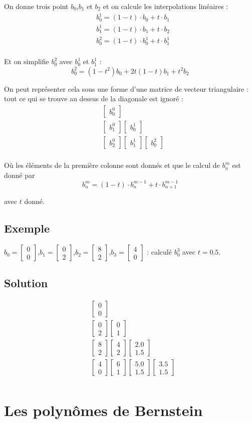 \documentclass[11pt,a4paper]{report}
\newcommand{\matv}[2]{\begin{bmatrix}#1 \\ #2 \end{bmatrix}}
\newcommand{\mato}[1]{\begin{bmatrix}#1\end{bmatrix}}
\begin{document}
On donne trois point $b_0$,$b_1$ et $b_2$ et on calcule les interpolations linéaires :
\begin{align*}
& b_0^1 = (1-t)\cdot b_0 + t \cdot b_1    \\
& b_1^1 = (1-t)\cdot b_1 + t \cdot b_2    \\
& b_0^2 = (1-t)\cdot b_0^1 + t \cdot b_1^1\\
\end{align*}

Et on simplifie $b_0^2$ avec $b_0^1$ et $b_1^1$ :
$$
b_0^2 = (1-t^2)b_0 + 2t(1-t)b_1 + t^2b_2
$$

On peut représenter cela sous une forme d'une matrice de vecteur triangulaire : tout ce qui se trouve au dessus de la diagonale est ignoré :
\begin{align*}
& \mato{b_0^0} \\
& \mato{b_1^0} \mato{b_0^1}\\
& \mato{b_2^0} \mato{b_1^1} \mato{b_0^2}\\
\end{align*}

Où les éléments de la première colonne sont donnés et que le calcul de $b_{n}^{m}$ est donné par 
$$
b_{n}^{m} = (1-t) \cdot b_{n}^{m-1} + t \cdot b_{n+1}^{m-1}
$$

avec $t$ donné.

\subsection*{Exemple}
$b_0 = \matv{0}{0}$,$b_1 = \matv{0}{2}$,$b_2 = \matv{8}{2}$,$b_3 = \matv{4}{0}$ : calculé $b^3_0$ avec $t=0.5$.
\subsection*{Solution}
\begin{align*}
& \matv{0}{0} \\
& \matv{0}{2} \matv{0}{1} \\
& \matv{8}{2} \matv{4}{2} \matv{2.0}{1.5} \\
& \matv{4}{0} \matv{6}{1} \matv{5.0}{1.5} \matv{3.5}{1.5} \\
\end{align*}

\section{Les polynômes de Bernstein}
\end{document}
